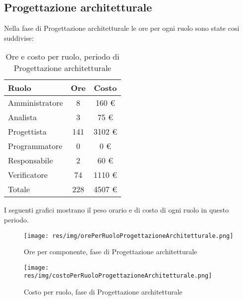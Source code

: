 \subsection{Progettazione architetturale}
Nella fase di Progettazione architetturale le ore per ogni ruolo sono state cosi suddivise:

\begin{table}[H]
	\centering
	\begin{tabular}{ l c c }
		\textbf{Ruolo} & \textbf{Ore} & \textbf{Costo} \\
		\hline
		Amministratore & 8 & 160 \euro \\
		Analista & 3 & 75 \euro \\
		Progettista & 141 & 3102 \euro \\
		Programmatore & 0 & 0 \euro \\
		Responsabile & 2 & 60 \euro \\
		Verificatore & 74 & 1110 \euro \\
		\hline
		Totale & 228 & 4507 \euro \\
		\hline
	\end{tabular}
	\caption{Ore e costo per ruolo, periodo di Progettazione architetturale}
\end{table}

I seguenti grafici mostrano il peso orario e di costo di ogni ruolo in questo periodo.

\begin{figure}[H]
  \begin{center}
    \texttt{[image: res/img/orePerRuoloProgettazioneArchitetturale.png]}
  \caption{Ore per componente, fase di Progettazione architetturale}
  \end{center} 
\end{figure}  

\begin{figure}[H]
  \begin{center}
    \texttt{[image: res/img/costoPerRuoloProgettazioneArchitetturale.png]}
  \caption{Costo per ruolo, fase di Progettazione architetturale}
  \end{center} 
\end{figure}  


